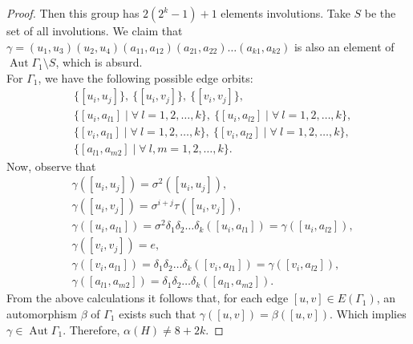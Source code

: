\documentclass[10pt,a4paper]{amsart}
\newcommand{\Aut}{\mathop{\mathrm{Aut}}}
\begin{document}
\begin{proof}
		Then this group has $2(2^{k} -1)+1$ elements involutions. Take $S$ be the set of all involutions. We claim that $\gamma = (u_{1}, u_{3})(u_{2}, u_{4})(a_{11}, a_{12})(a_{21}, a_{22})\ldots(a_{k1}, a_{k2})$ is also an element of $\Aut \Gamma_{1} \setminus S$, which is absurd.\\
		For $\Gamma_1$, we have the following possible edge orbits:
		\begin{align*}
			&\{[u_{i}, u_{j}]\},\ 
			\{[u_{i}, v_{j}]\},\ 
			\{[v_{i}, v_{j}]\},\\
			&\{[u_{i}, a_{l1}]\mid \forall \ l =1,2,\ldots,k\}, \
			\{[u_{i}, a_{l2}]\mid \forall \ l =1,2,\ldots,k\},\\ 
			& \{[v_{i}, a_{l1}]\mid \forall \ l =1,2,\ldots,k\},\	
			\{[v_{i}, a_{l2}]\mid \forall \ l =1,2,\ldots,k\},\\
			& \{[a_{l1}, a_{m2}]\mid \forall \ l,m =1,2,\ldots,k\}.
		\end{align*}	 
		Now, observe that
		\begin{align*}
			&\gamma([u_{i}, u_{j}]) = \sigma^{2}([u_{i}, u_{j}]),\\
			&\gamma([u_{i}, v_{j}]) = \sigma^{i+j}\tau ([u_{i}, v_{j}]),\\
			&\gamma([u_{i}, a_{l1}]) = \sigma^{2} \delta_{1} \delta_{2} \ldots \delta_{k} ([u_{i}, a_{l1}]) = \gamma([u_{i}, a_{l2}]),\\
			&\gamma([v_{i}, v_{j}]) = e,\\
			&\gamma([v_{i}, a_{l1}]) = \delta_{1} \delta_{2} \ldots \delta_{k} ([v_{i}, a_{l1}]) = \gamma([v_{i}, a_{l2}]),\\
			&\gamma([a_{l1}, a_{m2}]) = \delta_{1} \delta_{2} \ldots \delta_{k} ([a_{l1}, a_{m2}]).
		\end{align*}
		From the above calculations it follows that, for each edge $[u,v]\in E(\Gamma_1)$, an automorphism $\beta$ of $\Gamma_1$ exists such that $\gamma([u,v]) = \beta ([u,v])$. Which implies $\gamma\in \Aut \Gamma_1$. Therefore, $\alpha(H)\neq 8+2k$.  
		
		
		
		
		

\end{proof}
\end{document}
